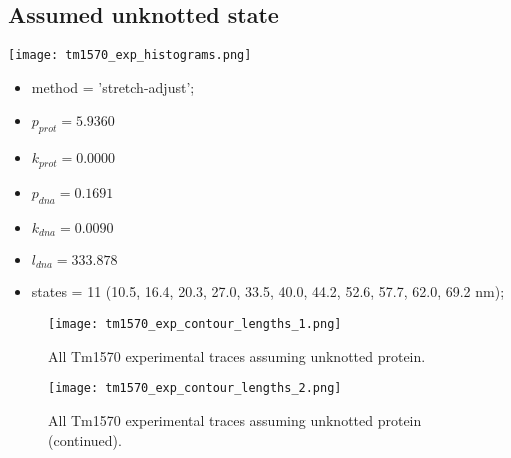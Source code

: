 \subsection{Assumed unknotted state}
\label{subsec:fit-details-tm1570-experiment-unknotted}
\begin{minipage}[c]{0.7\textwidth}
    \texttt{[image: tm1570\_exp\_histograms.png]}
\end{minipage}
\hfill
\begin{minipage}[c]{0.45\textwidth}
    \begin{itemize}
        \item method = 'stretch-adjust';
        \item $p_{prot}=5.9360$
        \item $k_{prot}=0.0000$
        \item $p_{dna}=0.1691$
        \item $k_{dna}=0.0090$
        \item $l_{dna}=333.878$
        \item states = 11 (10.5, 16.4, 20.3, 27.0, 33.5, 40.0, 44.2, 52.6, 57.7, 62.0, 69.2 nm);
    \end{itemize}
\end{minipage}

\begin{figure}
    \centering
    \texttt{[image: tm1570\_exp\_contour\_lengths\_1.png]}
    \caption{All Tm1570 experimental traces assuming unknotted protein.}
    \label{fig:unknotted-tm1570-exp-cl1}
\end{figure}

\begin{figure}
    \centering
    \texttt{[image: tm1570\_exp\_contour\_lengths\_2.png]}
    \caption{All Tm1570 experimental traces assuming unknotted protein (continued).}
    \label{fig:unknotted-tm1570-exp-cl2}
\end{figure}

